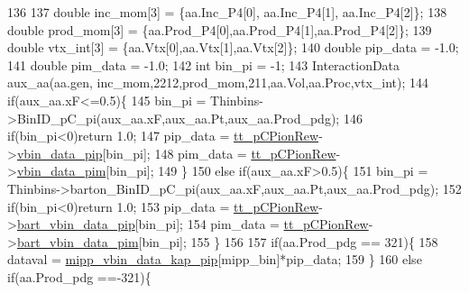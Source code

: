 \begin{DoxyCode}
136       
137       \textcolor{keywordtype}{double} inc\_mom[3]  = \{aa.Inc\_P4[0], aa.Inc\_P4[1], aa.Inc\_P4[2]\};
138       \textcolor{keywordtype}{double} prod\_mom[3] = \{aa.Prod\_P4[0],aa.Prod\_P4[1],aa.Prod\_P4[2]\};
139       \textcolor{keywordtype}{double} vtx\_int[3]  = \{aa.Vtx[0],aa.Vtx[1],aa.Vtx[2]\};
140       \textcolor{keywordtype}{double} pip\_data = -1.0; 
141       \textcolor{keywordtype}{double} pim\_data = -1.0; 
142       \textcolor{keywordtype}{int} bin\_pi = -1;
143       InteractionData aux\_aa(aa.gen, inc\_mom,2212,prod\_mom,211,aa.Vol,aa.Proc,vtx\_int);    
144       \textcolor{keywordflow}{if}(aux\_aa.xF<=0.5)\{
145         bin\_pi = Thinbins->BinID\_pC\_pi(aux\_aa.xF,aux\_aa.Pt,aux\_aa.Prod\_pdg);
146         \textcolor{keywordflow}{if}(bin\_pi<0)\textcolor{keywordflow}{return} 1.0;
147         pip\_data = \hyperlink{class_neutrino_flux_reweight_1_1_thin_targetp_c_kaon_reweighter_ab6dbf86a7f242f29d1f4e67bf1dc7e2f}{tt\_pCPionRew}->\hyperlink{class_neutrino_flux_reweight_1_1_thin_targetp_c_pion_reweighter_a3602ae8237c0cc7729045b13b90874b4}{vbin\_data\_pip}[bin\_pi];
148         pim\_data = \hyperlink{class_neutrino_flux_reweight_1_1_thin_targetp_c_kaon_reweighter_ab6dbf86a7f242f29d1f4e67bf1dc7e2f}{tt\_pCPionRew}->\hyperlink{class_neutrino_flux_reweight_1_1_thin_targetp_c_pion_reweighter_aea0dca1b93e560e26871da0bdf1ac075}{vbin\_data\_pim}[bin\_pi];        
149       \}
150       \textcolor{keywordflow}{else} \textcolor{keywordflow}{if}(aux\_aa.xF>0.5)\{
151         bin\_pi = Thinbins->barton\_BinID\_pC\_pi(aux\_aa.xF,aux\_aa.Pt,aux\_aa.Prod\_pdg);
152         \textcolor{keywordflow}{if}(bin\_pi<0)\textcolor{keywordflow}{return} 1.0;
153         pip\_data = \hyperlink{class_neutrino_flux_reweight_1_1_thin_targetp_c_kaon_reweighter_ab6dbf86a7f242f29d1f4e67bf1dc7e2f}{tt\_pCPionRew}->\hyperlink{class_neutrino_flux_reweight_1_1_thin_targetp_c_pion_reweighter_a844e9c7ba521a42ce5ebe5fbb5b2d5f4}{bart\_vbin\_data\_pip}[bin\_pi];
154         pim\_data = \hyperlink{class_neutrino_flux_reweight_1_1_thin_targetp_c_kaon_reweighter_ab6dbf86a7f242f29d1f4e67bf1dc7e2f}{tt\_pCPionRew}->\hyperlink{class_neutrino_flux_reweight_1_1_thin_targetp_c_pion_reweighter_a9d7ffcf3ca0c5a7b0f1c37435cc86403}{bart\_vbin\_data\_pim}[bin\_pi];      
155       \}
156 
157       \textcolor{keywordflow}{if}(aa.Prod\_pdg == 321)\{
158         dataval = \hyperlink{class_neutrino_flux_reweight_1_1_thin_targetp_c_kaon_reweighter_a6ad9b6cccb6fc522708b1aa5b9070c71}{mipp\_vbin\_data\_kap\_pip}[mipp\_bin]*pip\_data;
159       \}
160       \textcolor{keywordflow}{else} \textcolor{keywordflow}{if}(aa.Prod\_pdg ==-321)\{

\end{DoxyCode}
